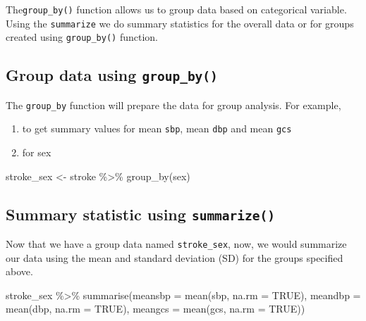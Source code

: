 \documentclass[
  10pt,
]{krantz}
\newenvironment{Shaded}{\begin{snugshade}}{\end{snugshade}}
\newcommand{\AttributeTok}[1]{\textcolor[rgb]{0.77,0.63,0.00}{#1}}
\newcommand{\ConstantTok}[1]{\textcolor[rgb]{0.00,0.00,0.00}{#1}}
\newcommand{\FunctionTok}[1]{\textcolor[rgb]{0.00,0.00,0.00}{#1}}
\newcommand{\NormalTok}[1]{#1}
\newcommand{\OtherTok}[1]{\textcolor[rgb]{0.56,0.35,0.01}{#1}}
\newcommand{\SpecialCharTok}[1]{\textcolor[rgb]{0.00,0.00,0.00}{#1}}
\providecommand{\tightlist}{%
  \setlength{\itemsep}{0pt}\setlength{\parskip}{0pt}}
\begin{document}
The\texttt{group\_by()} function allows us to group data based on categorical variable. Using the \texttt{summarize} we do summary statistics for the overall data or for groups created using \texttt{group\_by()} function.

\hypertarget{group-data-using-group_by}{%
\subsection{\texorpdfstring{Group data using \texttt{group\_by()}}{Group data using group\_by()}}\label{group-data-using-group_by}}

The \texttt{group\_by} function will prepare the data for group analysis. For example,

\begin{enumerate}
\def\labelenumi{\arabic{enumi}.}
\tightlist
\item
  to get summary values for mean \texttt{sbp}, mean \texttt{dbp} and mean \texttt{gcs}
\item
  for sex
\end{enumerate}

\begin{Shaded}
\begin{Highlighting}[]
\NormalTok{stroke\_sex }\OtherTok{\textless{}{-}}\NormalTok{ stroke }\SpecialCharTok{\%\textgreater{}\%} \FunctionTok{group\_by}\NormalTok{(sex)}
\end{Highlighting}
\end{Shaded}

\hypertarget{summary-statistic-using-summarize}{%
\subsection{\texorpdfstring{Summary statistic using \texttt{summarize()}}{Summary statistic using summarize()}}\label{summary-statistic-using-summarize}}

Now that we have a group data named \texttt{stroke\_sex}, now, we would summarize our data using the mean and standard deviation (SD) for the groups specified above.

\begin{Shaded}
\begin{Highlighting}[]
\NormalTok{stroke\_sex }\SpecialCharTok{\%\textgreater{}\%} \FunctionTok{summarise}\NormalTok{(}\AttributeTok{meansbp =} \FunctionTok{mean}\NormalTok{(sbp, }\AttributeTok{na.rm =} \ConstantTok{TRUE}\NormalTok{), }
                     \AttributeTok{meandbp  =} \FunctionTok{mean}\NormalTok{(dbp, }\AttributeTok{na.rm =} \ConstantTok{TRUE}\NormalTok{),}
                     \AttributeTok{meangcs =} \FunctionTok{mean}\NormalTok{(gcs, }\AttributeTok{na.rm =} \ConstantTok{TRUE}\NormalTok{))}
\end{Highlighting}
\end{Shaded}
\end{document}
